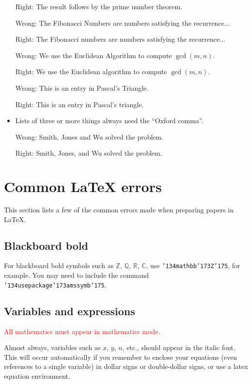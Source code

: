 \documentclass[12pt]{article}
\begin{document}
\begin{itemize}
Right:  The result follows by the prime number theorem.

Wrong:  The Fibonacci Numbers are numbers satisfying the
recurrence...

Right:  The Fibonacci numbers are numbers satisfying the
recurrence...

Wrong:  We use the Euclidean Algorithm to compute $\gcd(m,n)$.

Right:  We use the Euclidean algorithm to compute $\gcd(m,n)$.

Wrong:  This is an entry in Pascal's Triangle.

Right:  This is an entry in Pascal's triangle.

\item Lists of three or more things always need the ``Oxford comma''.

Wrong:  Smith, Jones and Wu solved the problem.

Right:  Smith, Jones, and Wu solved the problem.

\end{itemize}

\section{Common LaTeX errors}

     This section lists a few of the common errors made
when preparing papers in LaTeX.

\subsection{Blackboard bold}

     For blackboard bold symbols such as
$\mathbb Z$, $\mathbb Q$, $\mathbb R$, $\mathbb C$, use
{\tt \char'134mathbb\char'173Z\char'175}, for example.  You may need to include
the command {\tt \char'134usepackage\char'173amssymb\char'175}.

\subsection{Variables and expressions}

	\textcolor{red}{All mathematics must appear in mathematics mode.}

     Almost always, variables such as $x$, $y$, $n$, etc., should appear
in the italic font.  This will occur automatically if you remember
to enclose your equations (even references to a single variable) in
dollar signs or double-dollar signs, or use a latex equation environment.
\end{document}
